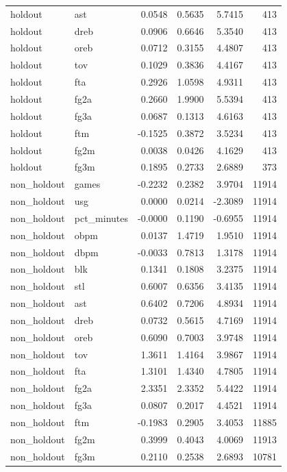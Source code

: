 \begin{table}
\begin{tabular}{llrrrr}
holdout & ast & 0.0548 & 0.5635 & 5.7415 & 413 \\
holdout & dreb & 0.0906 & 0.6646 & 5.3540 & 413 \\
holdout & oreb & 0.0712 & 0.3155 & 4.4807 & 413 \\
holdout & tov & 0.1029 & 0.3836 & 4.4167 & 413 \\
holdout & fta & 0.2926 & 1.0598 & 4.9311 & 413 \\
holdout & fg2a & 0.2660 & 1.9900 & 5.5394 & 413 \\
holdout & fg3a & 0.0687 & 0.1313 & 4.6163 & 413 \\
holdout & ftm & -0.1525 & 0.3872 & 3.5234 & 413 \\
holdout & fg2m & 0.0038 & 0.0426 & 4.1629 & 413 \\
holdout & fg3m & 0.1895 & 0.2733 & 2.6889 & 373 \\
non\_holdout & games & -0.2232 & 0.2382 & 3.9704 & 11914 \\
non\_holdout & usg & 0.0000 & 0.0214 & -2.3089 & 11914 \\
non\_holdout & pct\_minutes & -0.0000 & 0.1190 & -0.6955 & 11914 \\
non\_holdout & obpm & 0.0137 & 1.4719 & 1.9510 & 11914 \\
non\_holdout & dbpm & -0.0033 & 0.7813 & 1.3178 & 11914 \\
non\_holdout & blk & 0.1341 & 0.1808 & 3.2375 & 11914 \\
non\_holdout & stl & 0.6007 & 0.6356 & 3.4135 & 11914 \\
non\_holdout & ast & 0.6402 & 0.7206 & 4.8934 & 11914 \\
non\_holdout & dreb & 0.0732 & 0.5615 & 4.7169 & 11914 \\
non\_holdout & oreb & 0.6090 & 0.7003 & 3.9748 & 11914 \\
non\_holdout & tov & 1.3611 & 1.4164 & 3.9867 & 11914 \\
non\_holdout & fta & 1.3101 & 1.4340 & 4.7805 & 11914 \\
non\_holdout & fg2a & 2.3351 & 2.3352 & 5.4422 & 11914 \\
non\_holdout & fg3a & 0.0807 & 0.2017 & 4.4521 & 11914 \\
non\_holdout & ftm & -0.1983 & 0.2905 & 3.4053 & 11885 \\
non\_holdout & fg2m & 0.3999 & 0.4043 & 4.0069 & 11913 \\
non\_holdout & fg3m & 0.2110 & 0.2538 & 2.6893 & 10781 \\
\bottomrule
\end{tabular}
\end{table}
